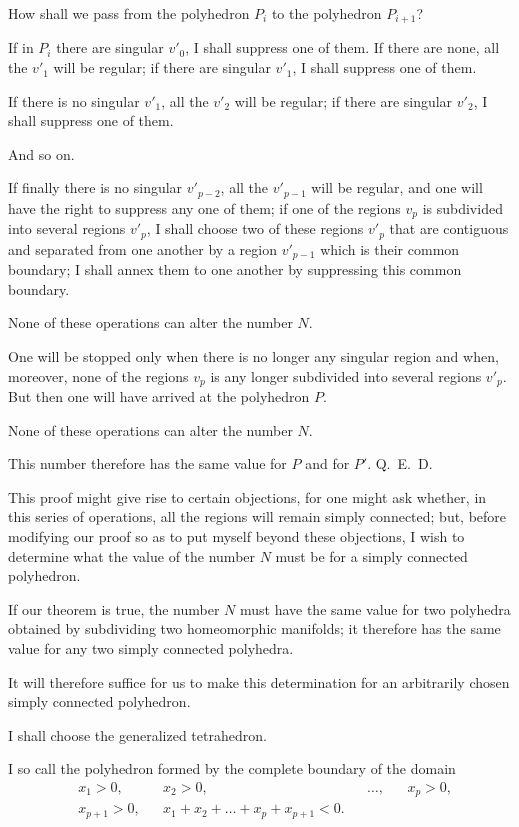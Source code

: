 \documentclass{article}
\begin{document}
How shall we pass from the polyhedron $P_{i}$ to the polyhedron $P_{i+1}$?

If in $P_{i}$ there are singular $v'_{0}$, I shall suppress one of them. If there are none, all the $v'_{1}$ will be regular; if there are singular $v'_{1}$, I shall suppress one of them.

If there is no singular $v'_{1}$, all the $v'_{2}$ will be regular; if there are singular $v'_{2}$, I shall suppress one of them.

And so on.

If finally there is no singular $v'_{p-2}$, all the $v'_{p-1}$ will be regular, and one will have the right to suppress any one of them; if one of the regions $v_{p}$ is subdivided into several regions $v'_{p}$, I shall choose two of these
regions $v'_{p}$ that are contiguous and separated from one another by a region $v'_{p-1}$ which is their common boundary; I shall annex them to one another by suppressing this common boundary.

None of these operations can alter the number $N$.

One will be stopped only when there is no longer any singular region and when, moreover, none of the regions $v_{p}$ is any longer subdivided into several regions $v'_{p}$. But then one will have arrived at the polyhedron $P$.

None of these operations can alter the number $N$.

This number therefore has the same value for $P$ and for $P'$. Q.~E.~D.

This proof might give rise to certain objections, for one might ask whether, in this series of operations, all the regions will remain simply connected; but, before modifying our proof so as to put myself beyond these objections, I wish to determine what the value of the number $N$ must be for a simply connected polyhedron.

If our theorem is true, the number $N$ must have the same value for two polyhedra obtained by subdividing two homeomorphic manifolds; it therefore has the same value for any two simply connected polyhedra.

It will therefore suffice for us to make this determination for an arbitrarily chosen simply connected polyhedron.

I shall choose the generalized tetrahedron.

I so call the polyhedron formed by the complete boundary of the domain
\[ \begin{aligned} &x_{1} > 0, &&x_{2} > 0, &&\ldots, &&x_{p} > 0,\\ &x_{p+1} > 0, &&x_{1} + x_{2} + \ldots + x_{p} + x_{p+1} < 0. \end{aligned} \]
\end{document}
